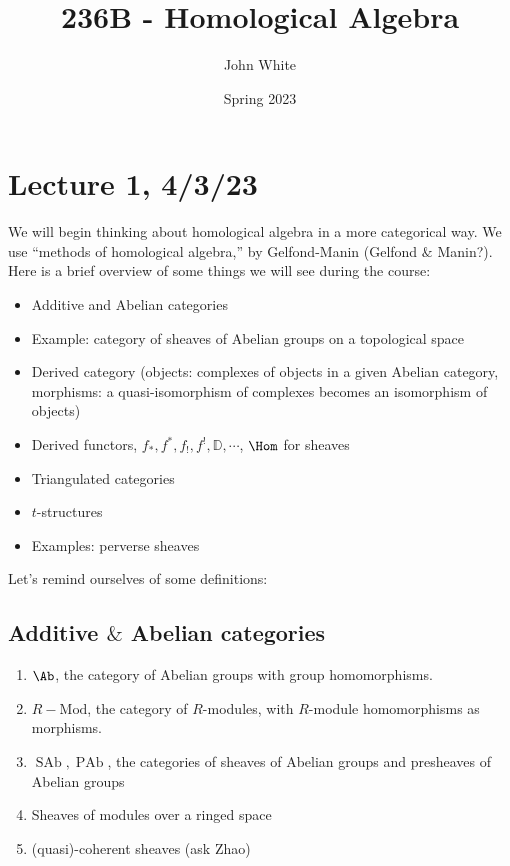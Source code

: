 \documentclass[x11names,reqno,14pt]{extarticle}
\title{236B - Homological Algebra}
\author{John White}
\date{Spring 2023}
\newcommand{\RMod}{R-\text{Mod}}
\newcommand{\D}{\mathbb{D}}
\DeclareMathOperator{\SAb}{SAb}
\DeclareMathOperator{\PAb}{PAb}
\begin{document}
\section*{Lecture 1, 4/3/23}

We will begin thinking about homological algebra in a more categorical way. We use ``methods of homological algebra,'' by Gelfond-Manin (Gelfond $\&$ Manin?). Here is a brief overview of some things we will see during the course:

\begin{itemize}

\item Additive and Abelian categories

\item Example: category of sheaves of Abelian groups on a topological space

\item Derived category (objects: complexes of objects in a given Abelian category, morphisms: a quasi-isomorphism of complexes becomes an isomorphism of objects)

\item Derived functors, $f_*, f^*, f_{!}, f^{!}, \D, \cdots$, $\Hom$ for sheaves

\item Triangulated categories

\item $t$-structures

\item Examples: perverse sheaves


\end{itemize} 


Let's remind ourselves of some definitions:

\subsection*{Additive $\&$ Abelian categories}

\exm

\begin{enumerate}[label=(\alph*)]

\item $\Ab$, the category of Abelian groups with group homomorphisms.

\item $\RMod$, the category of $R$-modules, with $R$-module homomorphisms as morphisms.

\item $\SAb, \PAb$, the categories of sheaves of Abelian groups and presheaves of Abelian groups

\item Sheaves of modules over a ringed space 

\item (quasi)-coherent sheaves (ask Zhao)

\end{enumerate}
\end{document}
